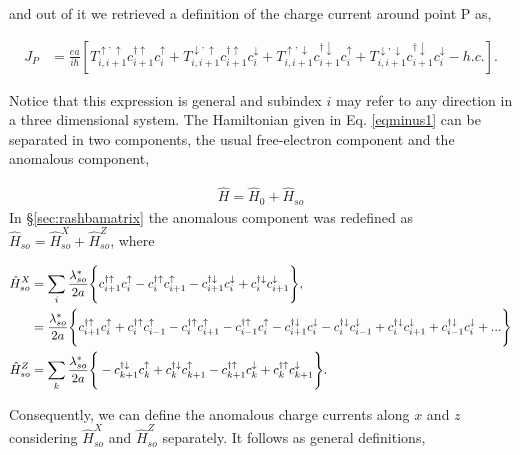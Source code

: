 \documentclass[10pt,prb,showpacs,amssymb,floatfix]{revtex4-1}
\newcommand{\dna}{\downarrow}
\newcommand{\nn}{\nonumber}
\newcommand{\upa}{\uparrow}
\newcommand{\h}{\hat}
\begin{document}
and out of it we retrieved a definition of the charge current around point P as,

\begin{align}
J_P &=\frac{ea}{i\hbar} [T^{\upa,\upa}_{i,i+1} c^{\dagger\upa}_{i+1} c^{\upa}_i+T^{\dna,\upa}_{i,i+1} c^{\dagger\upa}_{i+1} c^{\dna}_i + T^{\upa,\dna}_{i,i+1} c^{\dagger\dna}_{i+1} c^{\upa}_i+T^{\dna,\dna}_{i,i+1} c^{\dagger\dna}_{i+1} c^{\dna}_i   - h.c.].
\label{corriente222}
\end{align}


Notice that this expression is general and subindex $i$ may refer to any direction in a three dimensional system. The Hamiltonian given in Eq. \eqref{eqminus1} can be separated in two components, the usual free-electron component and the anomalous component,

\begin{align}
\h H = \h H_0 + \h H_{so}
\end{align}
In \S  \ref{sec:rashbamatrix} the anomalous component was redefined as $\h H_{so} = \h H_{so}^X + \h H_{so}^Z$, where  

\begin{align}
\label{hsoxxxo}
\hat H^X_{so} &= \sum_{i} \frac{\lambda_{so}^*}{2a}  \Bigg{\{} c_{i+1}^{\dagger \uparrow} c_{i}^\uparrow - c_{i}^{\dagger \uparrow} c_{i+1}^\uparrow  - c_{i+1}^{\dagger \downarrow} c_{i}^\downarrow + c_{i}^{\dagger \downarrow} c_{i+1}^\downarrow \Bigg{\}}, \nn\\
&=\frac{\lambda_{so}^*}{2a}  \Bigg{\{} c_{i+1}^{\dagger \uparrow} c_{i}^\uparrow  + c_{i}^{\dagger \uparrow} c_{i-1}^\uparrow - c_{i}^{\dagger \uparrow} c_{i+1}^\uparrow  - c_{i-1}^{\dagger \uparrow} c_{i}^\uparrow - c_{i+1}^{\dagger \downarrow} c_{i}^\downarrow - c_{i}^{\dagger \downarrow} c_{i-1}^\downarrow+ c_{i}^{\dagger \downarrow} c_{i+1}^\downarrow + c_{i-1}^{\dagger \downarrow} c_{i}^\downarrow + ...\Bigg{\}} \\
\hat H^Z_{so} &= \sum_{k}  \frac{\lambda_{so}^*}{2a} \Bigg{\{} -c_{k+1}^{\dagger \downarrow} c_{k}^\uparrow + c_{k}^{\dagger \downarrow} c_{k+1}^\uparrow   - c_{k+1}^{\dagger \uparrow} c_{k}^\downarrow +  c_{k}^{\dagger \uparrow} c_{k+1}^\downarrow \Bigg{\}}.
\label{hsozzzo}
\end{align}

Consequently, we can define the anomalous charge currents along $x$ and $z$ considering $\h H_{so}^X$ and $\h H_{so}^Z$ separately. It follows as general definitions,
\end{document}
